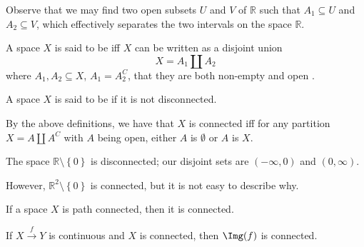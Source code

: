 \documentclass[notoc,notitlepage]{tufte-book}
\begin{document}
Observe that we may find two open subsets $U$ and $V$ of $\mathbb{R}$ such that $A_1 \subseteq U$
and $A_2 \subseteq V$, which effectively separates the two intervals on the space $\mathbb{R}$.

\begin{defn}[Disconnectedness]\label{defn:disconnectedness}
  A space $X$ is said to be  iff $X$ can be written as a
  disjoint union
  \begin{equation*}
    X = A_1 \coprod A_2
  \end{equation*}
  where $A_1, A_2 \subseteq X$, $A_1 = A_2^C$, that they are both non-empty and open
  .
\end{defn}

\begin{defn}[Connctedness]\label{defn:connctedness}
  A space $X$ is said to be  if it is not disconnected.
\end{defn}

\begin{note}
  By the above definitions, we have that $X$ is connected iff for any partition
  $X = A \coprod A^C$ with $A$ being open, either $A$ is $\emptyset$ or $A$ is $X$.
\end{note}

\begin{eg}
  The space $\mathbb{R} \setminus \left\{ 0 \right\}$ is disconnected; our disjoint sets
  are $(-\infty, 0)$ and $(0, \infty)$.
\end{eg}

However, $\mathbb{R}^2 \setminus \left\{ 0 \right\}$ is connected, but it is not easy to
describe why.

\begin{defn}[Path]\label{defn:path}
\end{defn}

\begin{lemma}\label{lemma:path_connectedness_implies_connectedness}
  If a space $X$ is path connected, then it is connected.
\end{lemma}

\begin{thm}\label{thm:from_connected_space_to_connected_space}
  If $X \overset{f}{\to} Y$ is continuous and $X$ is connected, then
  $\Img(f)$ is connected.
\end{thm}
\end{document}

